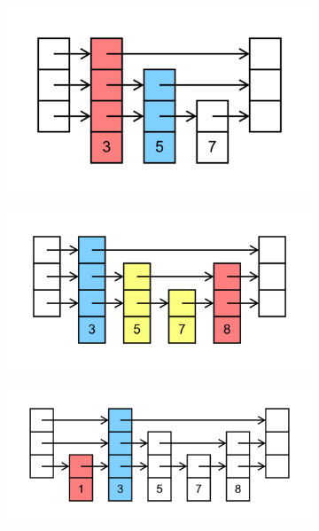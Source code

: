 \documentclass[11pt,a4paper]{article}
\begin{document}
\begin{loesung}
\begin{enumerate}
\begin{figure}[h!]
\begin{subfigure}[b]{0.3\textwidth}
            \end{subfigure}
            \begin{subfigure}[b]{0.3\textwidth}
                \centering
                \includegraphics[scale=0.15]{img/2a/3}
            \end{subfigure}
        \end{figure}
        \begin{figure}[h!]
            \centering
            \begin{subfigure}[b]{0.45\textwidth}
                \centering
                \includegraphics[scale=0.15]{img/2a/4}
            \end{subfigure}
            \begin{subfigure}[b]{0.45\textwidth}
                \centering
                \includegraphics[scale=0.15]{img/2a/5}

\end{subfigure}
\end{figure}
\end{enumerate}
\end{loesung}
\end{document}
